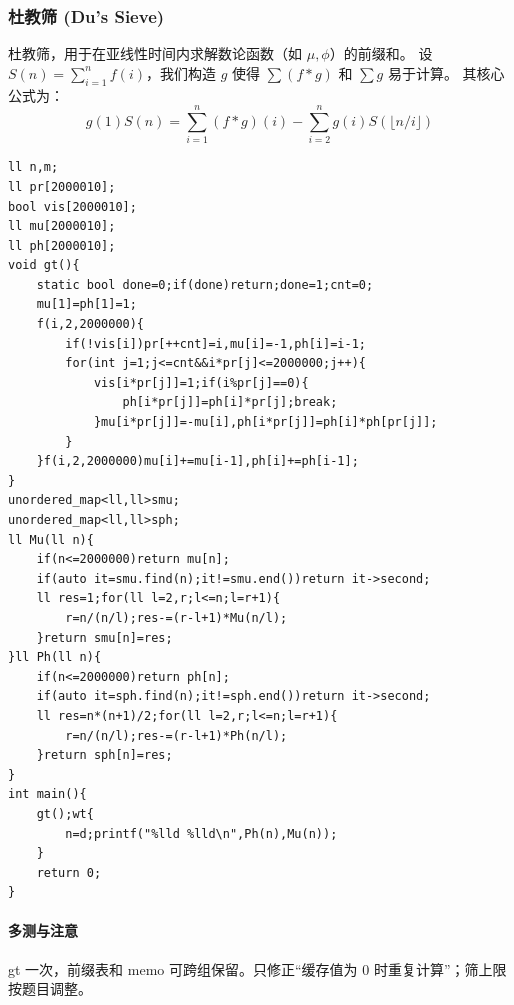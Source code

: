 \subsubsection{杜教筛 (Du's Sieve)}
杜教筛，用于在亚线性时间内求解数论函数（如 $\mu, \phi$）的前缀和。
设 $S(n) = \sum_{i=1}^n f(i)$，我们构造 $g$ 使得 $\sum (f*g)$ 和 $\sum g$ 易于计算。
其核心公式为：
$$ g(1)S(n) = \sum_{i=1}^n (f*g)(i) - \sum_{i=2}^n g(i)S(\lfloor n/i \rfloor) $$
\begin{lstlisting}
ll n,m;
ll pr[2000010];
bool vis[2000010];
ll mu[2000010];
ll ph[2000010];
void gt(){
    static bool done=0;if(done)return;done=1;cnt=0;
	mu[1]=ph[1]=1;
	f(i,2,2000000){
		if(!vis[i])pr[++cnt]=i,mu[i]=-1,ph[i]=i-1;
		for(int j=1;j<=cnt&&i*pr[j]<=2000000;j++){
			vis[i*pr[j]]=1;if(i%pr[j]==0){
				ph[i*pr[j]]=ph[i]*pr[j];break;
			}mu[i*pr[j]]=-mu[i],ph[i*pr[j]]=ph[i]*ph[pr[j]];
		}
	}f(i,2,2000000)mu[i]+=mu[i-1],ph[i]+=ph[i-1];
}
unordered_map<ll,ll>smu;
unordered_map<ll,ll>sph;
ll Mu(ll n){
	if(n<=2000000)return mu[n];
	if(auto it=smu.find(n);it!=smu.end())return it->second;
	ll res=1;for(ll l=2,r;l<=n;l=r+1){
		r=n/(n/l);res-=(r-l+1)*Mu(n/l);
	}return smu[n]=res;
}ll Ph(ll n){
	if(n<=2000000)return ph[n];
	if(auto it=sph.find(n);it!=sph.end())return it->second;
	ll res=n*(n+1)/2;for(ll l=2,r;l<=n;l=r+1){
		r=n/(n/l);res-=(r-l+1)*Ph(n/l);
	}return sph[n]=res;
}
int main(){
	gt();wt{
		n=d;printf("%lld %lld\n",Ph(n),Mu(n));
	}
	return 0;
}
\end{lstlisting}

\paragraph{多测与注意} gt 一次，前缀表和 memo 可跨组保留。只修正“缓存值为 0 时重复计算”；筛上限按题目调整。

